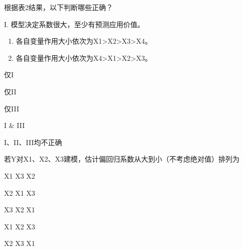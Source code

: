 \par\addvspace{6pt}\noindent\begin{minipage}{\linewidth}


根据表2结果，以下判断哪些正确？

I. 模型决定系数很大，至少有预测应用价值。

\begin{enumerate}
\def\labelenumi{\Roman{enumi}.}
\setcounter{enumi}{1}
\item
  各自变量作用大小依次为X1\textgreater X2\textgreater X3\textgreater X4。
\item
  各自变量作用大小依次为X4\textgreater X1\textgreater X2\textgreater X3。
\end{enumerate}


\begin{choices}

\item 仅I

\item 仅II

\item 仅III

\item I \& III

\item I、II、III均不正确

\end{choices}

\end{minipage}\par\vspace{4pt}

\par\addvspace{6pt}\noindent\begin{minipage}{\linewidth}


若Y对X1、X2、X3建模，估计偏回归系数从大到小（不考虑绝对值）排列为


\begin{choices}

\item X1 X3 X2

\item X2 X1 X3

\item X3 X2 X1

\item X1 X2 X3

\item X2 X3 X1

\end{choices}

\end{minipage}\par\vspace{4pt}

